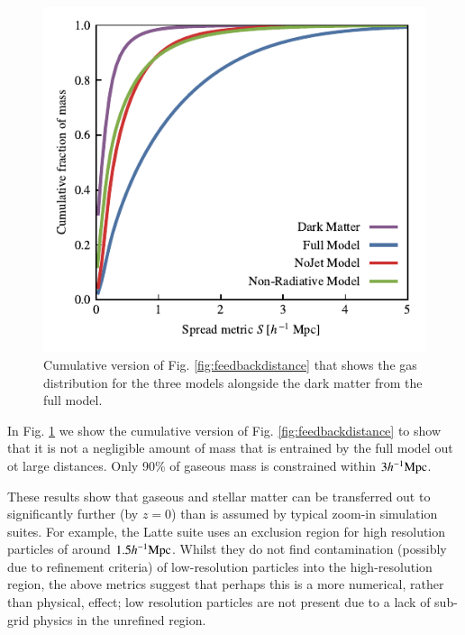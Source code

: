 \begin{figure}
    \centering
    \includegraphics{figures/cumulative_histogram_comparison.pdf}
    \vspace{-0.7cm}
    \caption{Cumulative version of Fig. \ref{fig:feedbackdistance} that
    shows the gas distribution for the three models alongside the dark
    matter from the full model.}
    \label{fig:cumulativehistogram}
\end{figure}

In Fig. \ref{fig:cumulativehistogram} we show the cumulative version of Fig. 
\ref{fig:feedbackdistance} to show that it is not a negligible amount of mass
that is entrained by the full model out ot large distances. Only 90\% of gaseous
mass is constrained within $3h^{-1}{\rm Mpc}{}$.

These results show that gaseous and stellar matter can be transferred out
to significantly further (by $z=0$) than is assumed by typical zoom-in simulation
suites. For example, the Latte \citep{Wetzel2016} suite uses an exclusion region
for high resolution particles of around $1.5 h^{-1}{\rm Mpc}{}$. Whilst they do not find
contamination (possibly due to refinement criteria) of low-resolution particles
into the high-resolution region, the above metrics suggest that perhaps this is
a more numerical, rather than physical, effect; low resolution particles are
not present due to a lack of sub-grid physics in the unrefined region.
